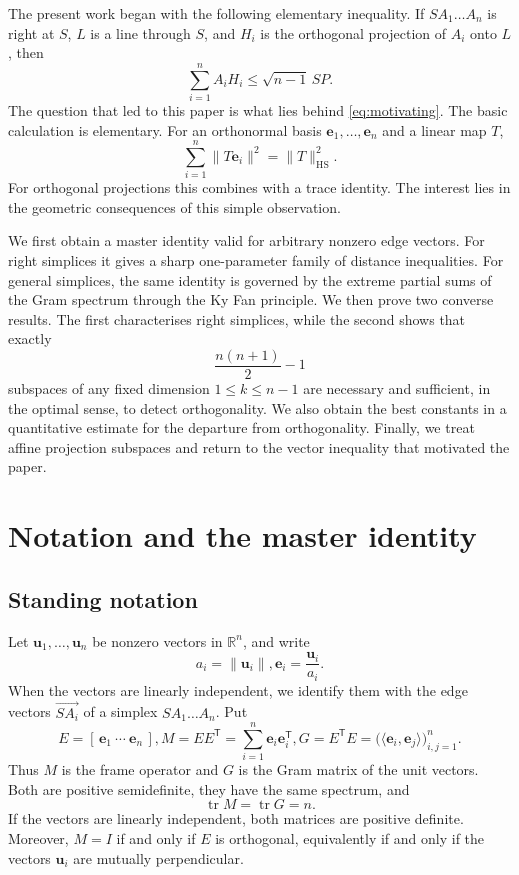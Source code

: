 \documentclass[11pt]{article}
\theoremstyle{definition}
\theoremstyle{remark}
\DeclareMathOperator{\tr}{tr}
\newcommand{\HS}{\mathrm{HS}}
\newcommand{\T}{\mathsf{T}}
\newcommand{\R}{\mathbb{R}}
\newcommand{\bu}{\mathbf u}
\newcommand{\be}{\mathbf e}
\newcommand{\norm}[1]{\lVert #1 \rVert}
\begin{document}
The present work began with the following elementary inequality. If $SA_1\ldots A_n$ is
right at $S$, $L$ is a line through $S$, and $H_i$ is the orthogonal projection of $A_i$
onto $L$, then
\begin{equation}\label{eq:motivating}
\sum_{i=1}^{n}A_iH_i\le\sqrt{n-1}\,SP.
\end{equation}
The question that led to this paper is what lies behind \eqref{eq:motivating}. The
basic calculation is elementary. For an orthonormal basis $\be_1,\ldots,\be_n$ and a linear map
$T$,
\[
\sum_{i=1}^{n}\norm{T\be_i}^2=\norm{T}_{\HS}^2.
\]
For orthogonal projections this combines with a trace identity. The interest lies in the
geometric consequences of this simple observation.

We first obtain a master identity valid for arbitrary nonzero edge vectors. For right
simplices it gives a sharp one-parameter family of distance inequalities. For general
simplices, the same identity is governed by the extreme partial sums of the Gram
spectrum through the Ky Fan principle. We then prove two converse results. The first
characterises right simplices, while the second shows that exactly
\[
\frac{n(n+1)}2-1
\]
subspaces of any fixed dimension $1\le k\le n-1$ are necessary and sufficient, in the
optimal sense, to detect orthogonality. We also obtain the best constants in a quantitative
estimate for the departure from orthogonality. Finally, we treat affine projection
subspaces and return to the vector inequality that motivated the paper.

\section{Notation and the master identity}\label{sec:master}

\subsection{Standing notation}

Let $\bu_1,\ldots,\bu_n$ be nonzero vectors in $\R^n$, and write
\[
a_i=\norm{\bu_i}, 
\be_i=\frac{\bu_i}{a_i}.
\]
When the vectors are linearly independent, we identify them with the edge vectors
$\overrightarrow{SA_i}$ of a simplex $SA_1\ldots A_n$. Put
\[
E=[\,\be_1\ \cdots\ \be_n\,], 
M=EE^{\T}=\sum_{i=1}^{n}\be_i\be_i^{\T}, 
G=E^{\T}E=\bigl(\langle\be_i,\be_j\rangle\bigr)_{i,j=1}^{n}.
\]
Thus $M$ is the frame operator and $G$ is the Gram matrix of the unit vectors. Both are
positive semidefinite, they have the same spectrum, and
\begin{equation}\label{eq:trM}
\tr M=\tr G=n.
\end{equation}
If the vectors are linearly independent, both matrices are positive definite. Moreover,
$M=I$ if and only if $E$ is orthogonal, equivalently if and only if the vectors $\bu_i$ are
mutually perpendicular.
\end{document}

